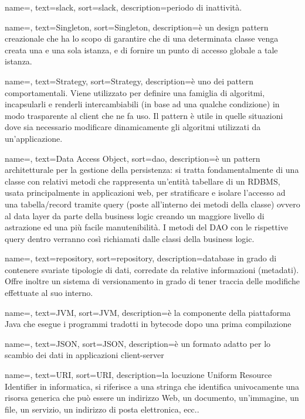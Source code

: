 {
	name=,
	text=slack,
	sort=slack,
	description={periodo di inattività.}
}

{
	name=,
	text=Singleton,
	sort=Singleton,
	description={è un design pattern creazionale che ha lo scopo di garantire che di una determinata classe venga creata una e una sola istanza, e di fornire un punto di accesso globale a tale istanza.}
}

{
	name=,
	text=Strategy,
	sort=Strategy,
	description={è uno dei pattern comportamentali. Viene utilizzato per definire una famiglia di algoritmi, incapsularli e renderli intercambiabili (in base ad una qualche condizione) in modo trasparente al client che ne fa uso. Il pattern è utile in quelle situazioni dove sia necessario modificare dinamicamente gli algoritmi utilizzati da un'applicazione.}
}

{
	name=,
	text=Data Access Object,
	sort=dao,
	description={è un pattern architetturale per la gestione della persistenza: si tratta fondamentalmente di una classe con relativi metodi che rappresenta un'entità tabellare di un RDBMS, usata principalmente in applicazioni web, per stratificare e isolare l'accesso ad una tabella/record tramite query (poste all'interno dei metodi della classe) ovvero al data layer da parte della business logic creando un maggiore livello di astrazione ed una più facile manutenibilità. I metodi del DAO con le rispettive query dentro verranno così richiamati dalle classi della business logic.}
}

{
	name=,
	text=repository,
	sort=repository,
	description={database in grado di contenere svariate tipologie di dati, corredate da relative informazioni (metadati). Offre inoltre un sistema di versionamento in grado di tener traccia delle modifiche effettuate al suo interno.}
}

{
	name=,
	text=JVM,
	sort=JVM,
	description={è la componente della piattaforma Java che esegue i programmi tradotti in bytecode dopo una prima compilazione}
}

{
	name=,
	text=JSON,
	sort=JSON,
	description={è un formato adatto per lo scambio dei dati in applicazioni client-server}
}

{
	name=,
	text=URI,
	sort=URI,
	description={la locuzione Uniform Resource Identifier in informatica, si riferisce a una stringa che identifica univocamente una risorsa generica che può essere un indirizzo Web, un documento, un’immagine, un file, un servizio, un indirizzo di posta elettronica, ecc..}
}

